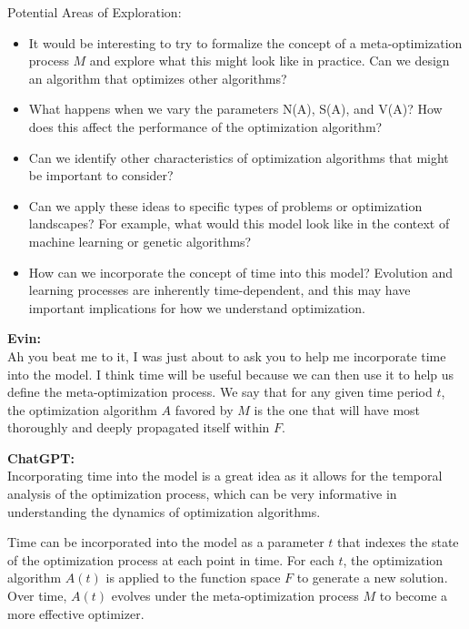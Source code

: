 \documentclass{article}[10pt]
\begin{document}
Potential Areas of Exploration:
\begin{itemize}
    \item It would be interesting to try to formalize the concept of a meta-optimization process \(M\) and explore what this might look like in practice. Can we design an algorithm that optimizes other algorithms?
    \item What happens when we vary the parameters N(A), S(A), and V(A)? How does this affect the performance of the optimization algorithm?
    \item Can we identify other characteristics of optimization algorithms that might be important to consider?
    \item Can we apply these ideas to specific types of problems or optimization landscapes? For example, what would this model look like in the context of machine learning or genetic algorithms?
    \item How can we incorporate the concept of time into this model? Evolution and learning processes are inherently time-dependent, and this may have important implications for how we understand optimization.
\end{itemize}


\noindent \textbf{Evin:}\\
Ah you beat me to it, I was just about to ask you to help me incorporate time into the model. 
I think time will be useful because we can then use it to help us define the meta-optimization process. 
We say that for any given time period $t$, the optimization algorithm $A$ favored by $M$ is the one that will have most thoroughly and deeply propagated itself within $F$.\par

\noindent \textbf{ChatGPT:}\\
Incorporating time into the model is a great idea as it allows for the temporal analysis of the optimization process, which can be very informative in understanding the dynamics of optimization algorithms. \par

Time can be incorporated into the model as a parameter \( t \) that indexes the state of the optimization process at each point in time. 
For each \( t \), the optimization algorithm \( A(t) \) is applied to the function space \( F \) to generate a new solution. 
Over time, \( A(t) \) evolves under the meta-optimization process \( M \) to become a more effective optimizer.\par
\end{document}
